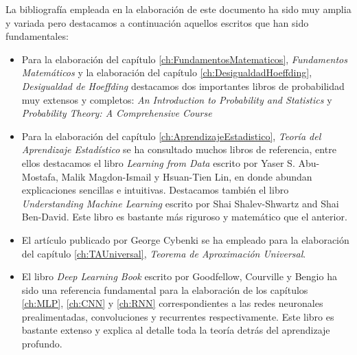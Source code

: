    La bibliografía empleada en la elaboración de este documento ha sido muy amplia y variada pero destacamos a continuación aquellos escritos que han sido fundamentales:
    
    \begin{itemize}
        
        \item Para la elaboración del capítulo \ref{ch:FundamentosMatematicos}, \textit{Fundamentos Matemáticos} y la elaboración del capítulo \ref{ch:DesigualdadHoeffding}, \textit{Desigualdad de Hoeffding} destacamos dos importantes libros de probabilidad muy extensos y completos: \textit{An Introduction to Probability and Statistics} \cite{Rohatgi2000}  y \textit{Probability Theory: A Comprehensive Course} \cite{probcourse}
        
        \item Para la elaboración del capítulo \ref{ch:AprendizajeEstadistico}, \textit{Teoría del Aprendizaje Estadístico} se ha consultado muchos libros de referencia, entre ellos destacamos el libro \textit{Learning from Data} \cite{data} escrito por Yaser S. Abu-Mostafa, Malik Magdon-Ismail y Hsuan-Tien Lin, en donde abundan explicaciones sencillas e intuitivas. Destacamos también el libro \textit{Understanding Machine Learning} \cite{UML} escrito por Shai Shalev-Shwartz and Shai Ben-David. Este libro es bastante más riguroso y matemático que el anterior.
    
        \item El artículo publicado por George Cybenki \cite{TeoremaAproxUni} se ha empleado para la elaboración del capítulo \ref{ch:TAUniversal}, \textit{Teorema de Aproximación Universal}.
        
        \item El libro \textit{Deep Learning Book} \cite{Goodfellow-et-al-2016} escrito por Goodfellow, Courville y Bengio ha sido una referencia fundamental para la elaboración de los capítulos \ref{ch:MLP}, \ref{ch:CNN} y \ref{ch:RNN} correspondientes a las redes neuronales prealimentadas, convoluciones y recurrentes respectivamente. Este libro es bastante extenso y explica al detalle toda la teoría detrás del aprendizaje profundo. \\
        
    \end{itemize}

    
    
    



\endinput
